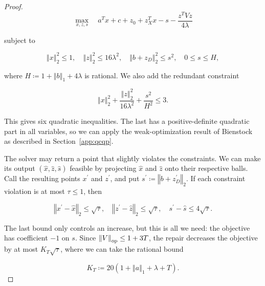 {{\begin{proof}
\begin{equation*}
\operatorname*{max}_{x , z , s} \quad a^{T} x + c + z_{0} + z_{X}^{T} x - s - \frac{z^{T} V z}{4 \lambda}
\end{equation*}


subject to


\begin{equation*}
{\left\Vert x \right\Vert}_{2}^{2} \le 1 , \quad {\left\Vert z \right\Vert}_{2}^{2} \le 16 \lambda^{2} , \quad {\left\Vert b + z_{D} \right\Vert}_{2}^{2} \le s^{2} , \quad 0 \le s \le H ,
\end{equation*}


where $H \coloneqq 1 + {\left\Vert b \right\Vert}_{1} + 4 \lambda$ is rational. We also add the redundant
constraint


\begin{equation*}
{\left\Vert x \right\Vert}_{2}^{2} + \frac{{\left\Vert z \right\Vert}_{2}^{2}}{16 \lambda^{2}} + \frac{s^{2}}{H^{2}} \le 3 .
\end{equation*}



This gives six quadratic inequalities. The last has a positive-definite
quadratic part in all variables, so we can apply the
weak-optimization result of Bienstock~\citep[Theorem~1.3]{bienstock2016cdt} as described in Section~\ref{app:qcqp}.

The solver may return a point that slightly violates the constraints.
We can make its output $\left( \hat{x} , \hat{z} , \hat{s} \right)$ feasible by projecting
$\hat{x}$ and $\hat{z}$ onto their respective balls. Call the resulting
points $x^{\prime}$ and $z^{\prime}$, and put $s^{\prime} \coloneqq {\left\Vert b + z_{D}^{\prime} \right\Vert}_{2}$. If each constraint
violation is at most $\tau \le 1$, then


\begin{equation*}
{\left\Vert x^{\prime} - \hat{x} \right\Vert}_{2} \le \sqrt{\tau} , \quad {\left\Vert z^{\prime} - \hat{z} \right\Vert}_{2} \le \sqrt{\tau} , \quad s^{\prime} - \hat{s} \le 4 \sqrt{\tau} .
\end{equation*}


The last bound only controls an increase, but this is all we need: the
objective has coefficient $- 1$ on $s$. Since
${\left\Vert V \right\Vert}_{\text{\normalfont op}} \le 1 + 3 T$, the repair decreases the objective by at most
$K_{T} \sqrt{\tau}$, where we can take the rational bound


\begin{equation*}
K_{T} \coloneqq 20 \left( 1 + {\left\Vert a \right\Vert}_{1} + \lambda + T \right) .
\end{equation*}



\end{proof}}}
